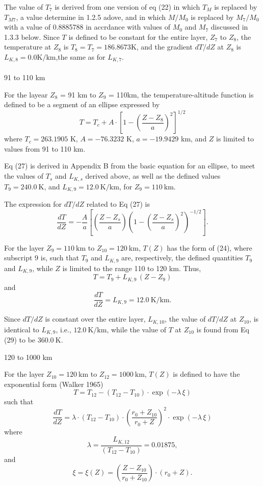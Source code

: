 \documentclass{article}
\begin{document}
The value of $T_7$ is derived from one version of eq (22) in which $T_M$ is replaced by $T_{M7}$, a value determine in 1.2.5 adove, and in which $M/M_0$ is replaced by $M_7/M_0$ with a value of 0.8885788 in accrdance with values of $M_0$ and $M_7$ discussed in 1.3.3 below. Since $T$ is defined to be constant for the entire layer, $Z_7$ to $Z_8$, the temperature at $Z_8$ is $T_8 = T_7 = 186.8673$K, and the gradient $dT/dZ$ at $Z_8$ is $L_{K,8} = 0.0\text{K/km}$,the same as for $L_{K,7}$.\\\\
91 to 110 km

For the layear $Z_8$ = 91 km to $Z_9$ = 110km, the temperature-altitude function is defined to be a segment of an ellipse expressed by
\begin{equation}
  T = T_c + A \cdot \left[ 1 - \left( \frac{Z - Z_8}{a} \right)^2 \right]^{1/2}
  \tag{27}
\end{equation}
where
$T_c = 263.1905$ K, $A = -76.3232$ K, $a = -19.9429$ km, and $Z$ is limited to values from 91 to 110 km.

Eq (27) is derived in Appendix B from the basic equation for an ellipse, to meet the values of $T_s$ and $L_{K,s}$ derived above, as well as the defined values $T_9 = 240.0~\text{K}$, and $L_{K,9} = 12.0~\text{K/km}$, for $Z_9 = 110~\text{km}$.

The expression for $dT/dZ$ related to Eq (27) is
\[
\frac{dT}{dZ} = -\frac{A}{a} \left[ \left(\frac{Z - Z_s}{a} \right) \left(1 - \left(\frac{Z - Z_s}{a} \right)^2 \right)^{-1/2} \right]. \tag{28}
\]

For the layer $Z_9 = 110~\text{km}$ to $Z_{10} = 120~\text{km}$, $T(Z)$ has the form of (24), where subscript 9 is, such that $T_9$ and $L_{K,9}$ are, respectively, the defined quantities $T_9$ and $L_{K,9}$, while $Z$ is limited to the range 110 to 120 km. Thus,
\[
T = T_9 + L_{K,9} \, (Z - Z_9) \tag{29}
\]
and
\[
\frac{dT}{dZ} = L_{K,9} = 12.0~\text{K/km}. \tag{30}
\]

Since $dT/dZ$ is constant over the entire layer, $L_{K,10}$, the value of $dT/dZ$ at $Z_{10}$, is identical to $L_{K,9}$, i.e., $12.0~\text{K/km}$, while the value of $T$ at $Z_{10}$ is found from Eq (29) to be $360.0~\text{K}$.

120 to 1000 km

For the layer $Z_{10} = 120~\text{km}$ to $Z_{12} = 1000~\text{km}$, $T(Z)$ is defined to have the exponential form (Walker 1965)
\[
T = T_{12} - (T_{12} - T_{10}) \cdot \exp(-\lambda \, \xi) \tag{31}
\]
such that
\[
\frac{dT}{dZ} = \lambda \cdot (T_{12} - T_{10}) \cdot \left(\frac{r_0 + Z_{10}}{r_0 + Z}\right)^2 \cdot \exp(-\lambda \, \xi) \tag{32}
\]
where
\[
\lambda = \frac{L_{K,12}}{(T_{12} - T_{10})} = 0.01875,
\]
and
\[
\xi = \xi(Z) = \left(\frac{Z - Z_{10}}{r_0 + Z_{10}}\right) \cdot (r_0 + Z).
\]
\end{document}
